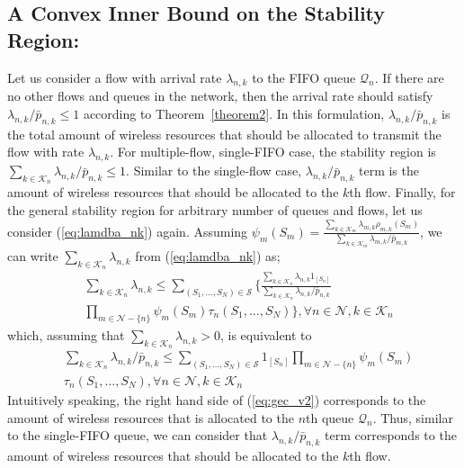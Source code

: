\documentclass[conference]{IEEEtran}
\newcommand{\Sset}{\mathcal{S}}
\newcommand{\Kset}{\mathcal{K}}
\newcommand{\Nset}{\mathcal{N}}
\newcommand{\Qset}{\mathcal{Q}}
\begin{document}
\subsection{A Convex Inner Bound on the Stability Region:} \label{sec:stability_single_innerBound}
Let us consider a flow with arrival rate $\lambda_{n,k}$ to the FIFO queue $\Qset_{n}$. If there are no other flows and queues in the network, then the arrival rate should satisfy $\lambda_{n,k}/\bar{p}_{n,k} \leq 1$ according to Theorem~\ref{theorem2}. In this formulation, $\lambda_{n,k}/\bar{p}_{n,k}$ is the total amount of wireless resources that should be allocated to transmit  the flow with rate $\lambda_{n,k}$. For multiple-flow, single-FIFO case, the stability region is $\sum_{k \in \Kset_n} {\lambda_{n,k}}/{\bar{p}_{n,k}} \leq 1$. Similar to the single-flow case, ${\lambda_{n,k}}/{\bar{p}_{n,k}}$ term is the amount of wireless resources that should be allocated to the $k$th flow. Finally, for the general stability region for arbitrary number of queues and flows, let us consider (\ref{eq:lamdba_nk}) again. Assuming $\psi_{m}(S_m) = \frac{\sum_{k \in \Kset_{m}} \lambda_{m,k} \rho_{m,k}(S_m)}{\sum_{k \in \Kset_{m}} \lambda_{m,k}/\bar{p}_{m,k}}$, we can write $\sum_{k \in \Kset_{n}} \lambda_{n,k}$ from (\ref{eq:lamdba_nk}) as;
\begin{align} \label{eq:gec_v1}
& \sum_{k \in \Kset_{n}} \lambda_{n,k} \leq \sum_{(S_1, \ldots, S_N) \in \Sset} \biggl \{ \frac{\sum_{k \in \Kset_{n}} \lambda_{n,k} 1_{[S_{n}]}}{\sum_{k \in \Kset_{n}} \lambda_{n,k}/\bar{p}_{n,k}} \nonumber \\
& \prod_{m \in \Nset-\{n\}}  \psi_{m}(S_m)  \tau_{n} (S_1, \ldots, S_N) \biggr \}, \forall n \in \Nset, k \in \Kset_{n}
\end{align} which, assuming that $\sum_{k \in \Kset_{n}}\lambda_{n,k} > 0$,  is equivalent to
\begin{align} \label{eq:gec_v2}
& \sum_{k \in \Kset_{n}} \lambda_{n,k}/\bar{p}_{n,k} \leq \sum_{(S_1, \ldots, S_N) \in \Sset} 1_{[S_{n}]} \prod_{m \in \Nset-\{n\}}  \psi_{m}(S_m) \nonumber \\
& \tau_{n} (S_1, \ldots, S_N), \forall n \in \Nset, k \in \Kset_{n}
\end{align} Intuitively speaking, the right hand side of (\ref{eq:gec_v2}) corresponds to the amount of wireless resources that is allocated to the $n$th queue $\Qset_{n}$. Thus, similar to the single-FIFO queue, we can consider that ${\lambda_{n,k}}/{\bar{p}_{n,k}}$ term corresponds to the amount of wireless resources that should be allocated to the $k$th flow.
\end{document}
